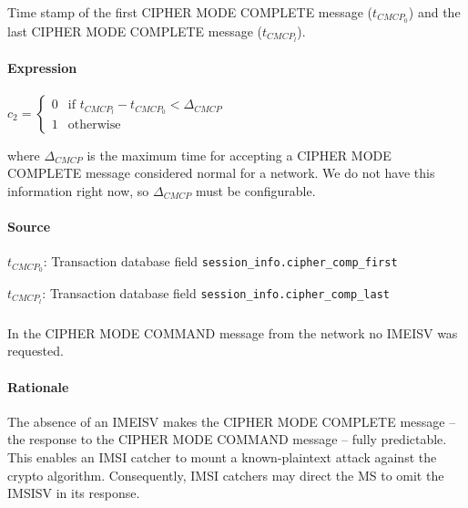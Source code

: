 \documentclass[a4paper,11pt,notitlepage,bigheadings,oneside]{scrartcl}
\begin{document}
Time stamp of the first CIPHER MODE COMPLETE message ($t_{CMCP_0}$) and the
last CIPHER MODE COMPLETE message ($t_{CMCP_l}$).

\paragraph{Expression}

$c_2 =
\begin{cases}
	0 	&  \text{if } t_{CMCP_l} - t_{CMCP_0} < \Delta_{CMCP} \\
	1       &  \text{otherwise}
\end{cases}$

where $\Delta_{CMCP}$ is the maximum time for accepting a CIPHER MODE COMPLETE
message considered normal for a network. We do not have this information right
now, so $\Delta_{CMCP}$ must be configurable.


\paragraph{Source}

$t_{CMCP_0}$: Transaction database field \verb|session_info.cipher_comp_first|

$t_{CMCP_l}$: Transaction database field \verb|session_info.cipher_comp_last|

\subsubsection{}

In the CIPHER MODE COMMAND message from the network no IMEISV was requested.

\paragraph{Rationale}

The absence of an IMEISV makes the CIPHER MODE COMPLETE message -- the response
to the CIPHER MODE COMMAND message -- fully predictable. This enables an IMSI
catcher to mount a known-plaintext attack against the crypto algorithm.
Consequently, IMSI catchers may direct the MS to omit the IMSISV in its
response.
\end{document}
